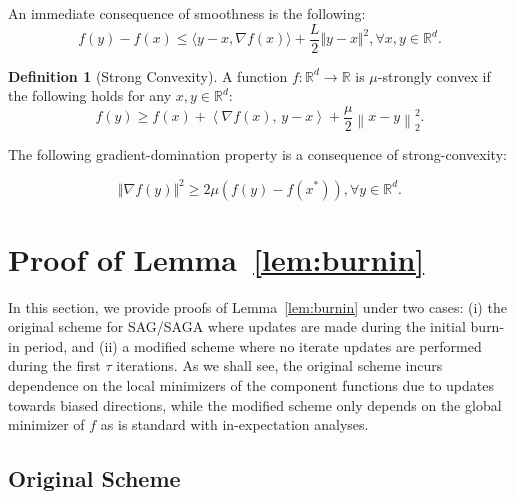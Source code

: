 \documentclass{article}
\theoremstyle{plain}
\theoremstyle{definition}
\newtheorem{definition}[theorem]{Definition}
\newcommand{\R}{\mathbb{R}}
\newcommand{\iprod}[2]{\left\langle #1,\, #2\right\rangle}
\newcommand{\norm}[1]{\left\| #1\right\|_{2}}
\begin{document}
An immediate consequence of smoothness is the following:
\begin{equation}
    f(y)-f(x) \leq \langle y-x, \nabla f(x) \rangle +\frac{L}{2}{\Vert y-x \Vert}^2, \forall x, y \in \mathbb{R}^d.
\label{eqn:smooth1}
\end{equation}
\begin{definition}[Strong Convexity]
A function $f:\R^d\to \R$ is $\mu$-strongly convex if the following holds for any $x,y\in\R^d$:
\begin{equation}
    f(y)\geq f(x)+\iprod{\nabla f(x)}{y-x} + \frac{\mu}{2}\norm{x-y}^2.
\end{equation}
\end{definition}

The following gradient-domination property is a consequence of strong-convexity: 

\begin{equation}
    {\Vert \nabla f(y) \Vert}^2 \geq 2\mu (f(y)-f(x^*)), \forall y \in \mathbb{R}^d. 
\label{eqn:grad_low}
\end{equation}

\newpage
\section{Proof of Lemma~\ref{lem:burnin}}\label{app:burnin}
{In this section, we provide proofs of Lemma~\ref{lem:burnin} under two cases: (i) the original scheme for SAG/SAGA where updates are made during the initial burn-in period, and (ii) a modified scheme where no iterate updates are performed during the first $\tau$ iterations. As we shall see, the original scheme incurs dependence on the local minimizers of the component functions due to updates towards biased directions, while the modified scheme only depends on the global minimizer of $f$ as is standard with in-expectation analyses.}

\subsection{Original Scheme}\label{app:burnin_original}
\end{document}

